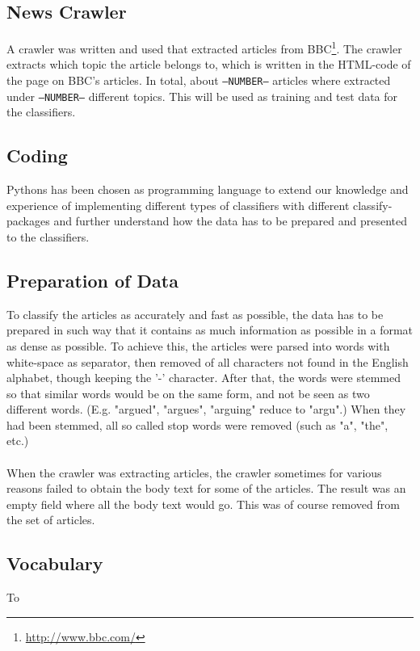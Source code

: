 \subsection{News Crawler}
	A crawler was written and used that extracted articles from BBC\footnote{\url{http://www.bbc.com/}}. The crawler extracts which topic the article belongs to, which is written in the HTML-code of the page on BBC's articles. In total, about \texttt{--NUMBER--} articles where extracted under \texttt{--NUMBER--} different topics. This will be used as training and test data for the classifiers.
	\subsection{Coding}
	Pythons has been chosen as programming language to extend our knowledge and experience of implementing different types of classifiers with different classify-packages and further understand how the data has to be prepared and presented to the classifiers.
	\subsection{Preparation of Data}
	To classify the articles as accurately and fast as possible, the data has to be prepared in such way that it contains as much information as possible in a format as dense as possible. To achieve this, the articles were parsed into words with white-space as separator, then removed of all characters not found in the English alphabet, though keeping the '-' character. After that, the words were stemmed so that similar words would be on the same form, and not be seen as two different words. (E.g. "argued", "argues", "arguing" reduce to "argu".) When they had been stemmed, all so called stop words were removed (such as "a", "the", etc.)
	\\\\
	When the crawler was extracting articles, the crawler sometimes for various reasons failed to obtain the body text for some of the articles. The result was an empty field where all the body text would go. This was of course removed from the set of articles.
	\subsection{Vocabulary}
	To 
